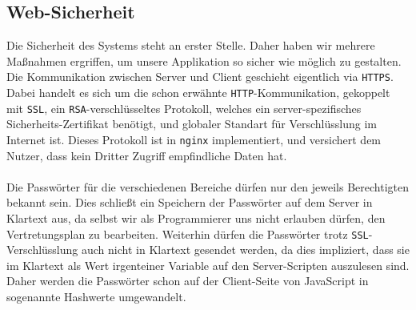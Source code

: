 \subsection{Web-Sicherheit}
Die Sicherheit des Systems steht an erster Stelle. Daher haben wir mehrere Maßnahmen ergriffen,
um unsere Applikation so sicher wie möglich zu gestalten. Die Kommunikation zwischen Server
und Client geschieht eigentlich via \texttt{HTTPS}. Dabei handelt es sich um die schon erwähnte
\texttt{HTTP}-Kommunikation, gekoppelt mit \texttt{SSL}, ein \texttt{RSA}-verschlüsseltes Protokoll,
welches ein server-spezifisches Sicherheits-Zertifikat benötigt, und globaler Standart für
Verschlüsslung im Internet ist. Dieses Protokoll ist in \texttt{nginx} implementiert, und versichert
dem Nutzer, dass kein Dritter Zugriff empfindliche Daten hat.\\\\
Die Passwörter für die verschiedenen Bereiche dürfen nur den jeweils Berechtigten bekannt sein. Dies
schließt ein Speichern der Passwörter auf dem Server in Klartext aus, da selbst wir als Programmierer
uns nicht erlauben dürfen, den Vertretungsplan zu bearbeiten. Weiterhin dürfen die Passwörter trotz
\texttt{SSL}-Verschlüsslung auch nicht in Klartext gesendet werden, da dies impliziert, dass sie im
Klartext als Wert irgenteiner Variable auf den Server-Scripten auszulesen sind. Daher werden die
Passwörter schon auf der Client-Seite von JavaScript in sogenannte Hashwerte umgewandelt. 

